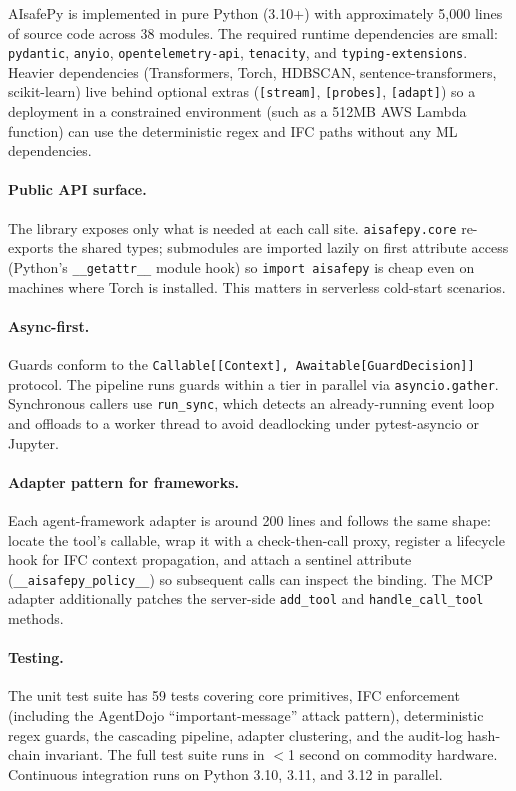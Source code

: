 AIsafePy is implemented in pure Python (3.10+) with approximately
5,000 lines of source code across 38 modules. The required runtime
dependencies are small: \texttt{pydantic}, \texttt{anyio},
\texttt{opentelemetry-api}, \texttt{tenacity}, and
\texttt{typing-extensions}. Heavier dependencies (Transformers, Torch,
HDBSCAN, sentence-transformers, scikit-learn) live behind optional
extras (\texttt{[stream]}, \texttt{[probes]}, \texttt{[adapt]}) so a
deployment in a constrained environment (such as a 512MB AWS Lambda
function) can use the deterministic regex and IFC paths without any
ML dependencies.

\paragraph{Public API surface.} The library exposes only what is
needed at each call site. \texttt{aisafepy.core} re-exports the
shared types; submodules are imported lazily on first attribute
access (Python's \texttt{\_\_getattr\_\_} module hook) so
\texttt{import aisafepy} is cheap even on machines where Torch is
installed. This matters in serverless cold-start scenarios.

\paragraph{Async-first.} Guards conform to the
\texttt{Callable[[Context], Awaitable[GuardDecision]]} protocol. The
pipeline runs guards within a tier in parallel via
\texttt{asyncio.gather}. Synchronous callers use \texttt{run\_sync},
which detects an already-running event loop and offloads to a worker
thread to avoid deadlocking under pytest-asyncio or Jupyter.

\paragraph{Adapter pattern for frameworks.} Each agent-framework
adapter is around 200 lines and follows the same shape: locate the
tool's callable, wrap it with a check-then-call proxy, register a
lifecycle hook for IFC context propagation, and attach a sentinel
attribute (\texttt{\_\_aisafepy\_policy\_\_}) so subsequent calls can
inspect the binding. The MCP adapter additionally patches the
server-side \texttt{add\_tool} and \texttt{handle\_call\_tool}
methods.

\paragraph{Testing.} The unit test suite has 59 tests covering core
primitives, IFC enforcement (including the AgentDojo
``important-message'' attack pattern), deterministic regex guards,
the cascading pipeline, adapter clustering, and the audit-log
hash-chain invariant. The full test suite runs in $<$1 second on
commodity hardware. Continuous integration runs on Python 3.10, 3.11,
and 3.12 in parallel.

